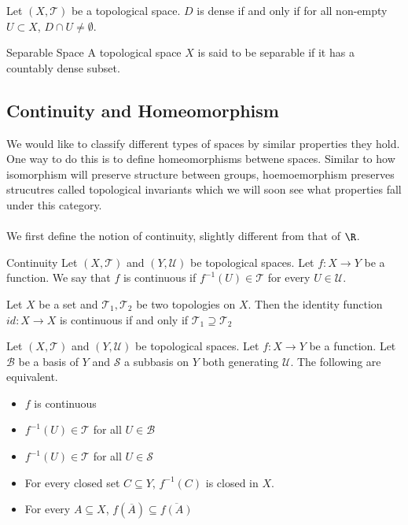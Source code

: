 \begin{prp}{}{} Let $(X,\mathcal{T})$ be a topological space. $D$ is dense if and only if for all non-empty $U\subset X$, $D\cap U\neq\emptyset$. 
\end{prp}

\begin{defn}{Separable Space}{} A topological space $X$ is said to be separable if it has a countably dense subset. 
\end{defn}

\subsection{Continuity and Homeomorphism}
We would like to classify different types of spaces by similar properties they hold. One way to do this is to define homeomorphisms betwene spaces. Similar to how isomorphism will preserve structure between groups, hoemoemorphism preserves strucutres called topological invariants which we will soon see what properties fall under this category. \\~\\
We first define the notion of continuity, slightly different from that of $\R$. 
\begin{defn}{Continuity}{} Let $(X,\mathcal{T})$ and $(Y,\mathcal{U})$ be topological spaces. Let $f:X\to Y$ be a function. We say that $f$ is continuous if $f^{-1}(U)\in\mathcal{T}$ for every $U\in\mathcal{U}$. 
\end{defn}

\begin{prp}{}{} Let $X$ be a set and $\mathcal{T}_1,\mathcal{T}_2$ be two topologies on $X$. Then the identity function $id:X\to X$ is continuous if and only if $\mathcal{T}_1\supseteq\mathcal{T}_2$
\end{prp}

\begin{prp}{}{} Let $(X,\mathcal{T})$ and $(Y,\mathcal{U})$ be topological spaces. Let $f:X\to Y$ be a function. Let $\mathcal{B}$ be a basis of $Y$ and $\mathcal{S}$ a subbasis on $Y$ both generating $\mathcal{U}$. The following are equivalent. 
\begin{itemize}
\item $f$ is continuous
\item $f^{-1}(U)\in\mathcal{T}$ for all $U\in\mathcal{B}$
\item $f^{-1}(U)\in\mathcal{T}$ for all $U\in\mathcal{S}$
\item For every closed set $C\subseteq Y$, $f^{-1}(C)$ is closed in $X$. 
\item For every $A\subseteq X$, $f(\overline{A})\subseteq\overline{f(A)}$
\end{itemize}
\end{prp}

